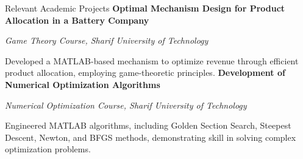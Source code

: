 \begin{rubric}{Relevant Academic Projects}
\entry*%
	\textbf{Optimal Mechanism Design for Product Allocation in a Battery Company} 
    \par \emph{Game Theory Course, Sharif University of Technology}
    \par Developed a MATLAB-based mechanism to optimize revenue through efficient product allocation, employing game-theoretic principles.
%
\entry*
	\textbf{Development of Numerical Optimization Algorithms	}
    \par \emph{Numerical Optimization Course, Sharif University of Technology}
    \par Engineered MATLAB algorithms, including Golden Section Search, Steepest Descent, Newton, and BFGS methods, demonstrating skill in solving complex optimization problems.
%
\end{rubric}
